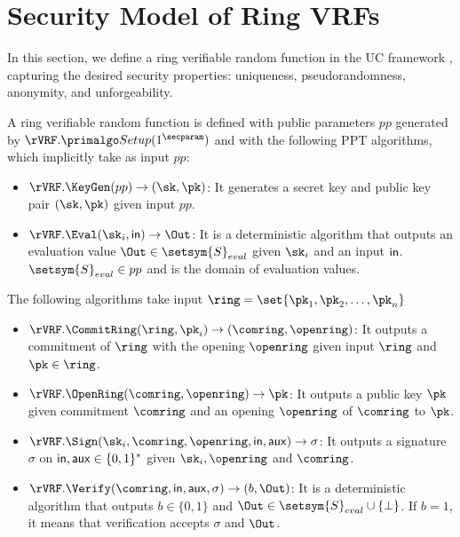 
\section{Security Model  of Ring VRFs}\label{sec:functionality}

In this section, we define a ring verifiable random function in the UC framework  \cite{canetti1,canetti2}, capturing the desired security properties: uniqueness, pseudorandomness, anonymity, and unforgeability.

\begin{definition} \label{def:ringVRF}	 A ring verifiable random function is defined with public parameters $ pp $ generated by 
$ \rVRF.\Setup(1^\secparam) $ and with the following  PPT algorithms, which implicitly take as input $ pp $:
	\begin{itemize}
		\item $ \rVRF.\KeyGen(pp) \rightarrow (\sk,\pk)$: It generates a secret key and public key pair $ (\sk,\pk) $ given input $ pp $.
		\item $ \rVRF.\Eval(\sk_i, \msg) \rightarrow \Out$: It is a deterministic algorithm that outputs an evaluation value $ \Out \in \setsym{S}_{eval}$ given  $ \sk_i $ and an input $ \mathsf{in} $. 
		$ \setsym{S}_{eval} \in pp$ and is the domain  of  evaluation values.
	\end{itemize}
	The following algorithms take input $ \ring = \set{\pk_1, \pk_2, \ldots, \pk_n}$
	\begin{itemize}
		\item $ \rVRF.\CommitRing(\ring, \pk_i)  \rightarrow (\comring, \openring)$: It  outputs a commitment of $ \ring $ with the opening $ \openring $ given input  $ \ring $ and $ \pk \in \ring $.
		\item $ \rVRF.\OpenRing(\comring,\openring) \rightarrow \pk $: It  outputs a public key $ \pk  $ given commitment $ \comring $ and an opening $ \openring $ of $\comring$ to $\pk$.
		\item $ \rVRF.\Sign(\sk_i, \comring,\openring, \msg, \aux)\rightarrow \sigma$: It  outputs a  signature  $\sigma $  on  $ \mathsf{in}, \mathsf{aux} \in \{0,1\}^*$ given $ \sk_i, \openring $  and $ \comring $.
		\item $ \rVRF.\Verify(\comring,\msg,\aux,\sigma) \rightarrow  (b, \Out)$: It is a deterministic  algorithm that outputs  $ b \in \{0,1\} $ and $ \Out \in\setsym{S}_{eval}\cup \{\perp\} $. If $ b =1 $, it means that verification accepts $ \sigma $ and $ \Out $.
	\end{itemize}
	
\end{definition}


